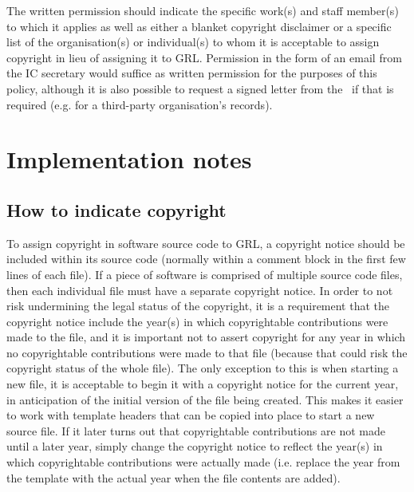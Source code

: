 \documentclass[10pt,a4paper]{article}
\begin{document}
\par The written permission should indicate the specific work(s) and staff member(s) 
to which it applies as well as either a blanket copyright disclaimer or a specific list of 
the organisation(s) or individual(s) to whom it is acceptable to assign copyright in 
lieu of assigning it to GRL. Permission in the form of an email from the IC secretary 
would suffice as written permission for the purposes of this policy, although it is also 
possible to request a signed letter from the \exectitle\ if that is required (e.g. for a 
third-party organisation's records). 






\section{Implementation notes}
\label{section:impnotes}

\subsection{How to indicate copyright}
\label{section:howto.copyright}
\par To assign copyright in software source code to GRL, a copyright notice should 
be included within its source code (normally within a comment block in the first 
few lines of each file). If a piece of software is comprised of multiple source code 
files, then each individual file must have a separate copyright notice. In order to 
not risk undermining the legal status of the copyright, it is a requirement that the 
copyright notice include the year(s) in which copyrightable contributions were 
made to the file, and it is important not to assert copyright for any year in which 
no copyrightable contributions were made to that file (because that could risk the 
copyright status of the whole file). The only exception to this is when starting a 
new file, it is acceptable to begin it with a copyright notice for the current year, in 
anticipation of the initial version of the file being created. This makes it easier to 
work with template headers that can be copied into place to start a new source 
file. If it later turns out that copyrightable contributions are not made until 
a later year, simply change the copyright notice to reflect the year(s) in which 
copyrightable contributions were actually made (i.e. replace the year from the 
template with the actual year when the file contents are added). 
\end{document}
